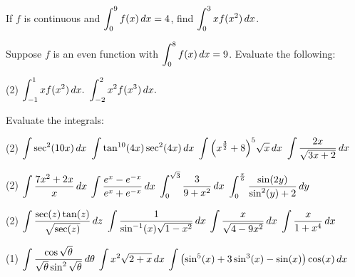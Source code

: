 \documentclass[answers]{exam}
\begin{document}
  \begin{ex*}
    If $f$ is continuous and $\ds\int_0^9 f(x)\,dx=4$, find $\ds\int_0^3 xf(x^2)\,dx$.
  \end{ex*}
  
  \begin{ex*}
    Suppose $f$ is an even function with $\ds\int_0^8 f(x)\,dx=9$. Evaluate the following:
  \end{ex*}
  \begin{tasks}(2)
    \task $\ds\int_{-1}^1 x f(x^2)\,dx.$
    \task $\ds\int_{-2}^2 x^2 f(x^3)\,dx.$
  \end{tasks}
  \pagebreak
  
  \begin{ex*}
    Evaluate the integrals:
  \end{ex*}
  \begin{tasks}[after-item-skip=\stretch{1}](2)
    \task $\ds\int \sec^2(10x)\,dx$
    \task $\ds\int \tan^{10}(4x)\sec^2(4x)\,dx$
    \task $\ds\int\parens{x^\frac{3}{2}+8}^5\sqrt{x}\,dx$
    \task $\ds\int \frac{2x}{\sqrt{3x+2}}\,dx$
  \end{tasks}
  \pagebreak
  
  \begin{tasks}[after-item-skip=\stretch{1}, resume](2)
    \task $\ds\int \frac{7x^2+2x}{x}\,dx$
    \task $\ds\int \frac{e^x-e\inv[x]}{e^x+e\inv[x]}\,dx$
    \task $\ds\int_0^{\sqrt{3}} \frac{3}{9+x^2}\,dx$
    \task $\ds\int_0^{\frac{\pi}{6}} \frac{\sin(2y)}{\sin^2(y)+2}\,dy$
  \end{tasks}
  \pagebreak
  
  \begin{tasks}[after-item-skip=\stretch{1}, resume](2)
    \task $\ds\int \frac{\sec(z)\tan(z)}{\sqrt{\sec(z)}}\,dz$
    \task $\ds\int \frac{1}{\sin\inv(x)\sqrt{1-x^2}}\,dx$
    \task $\ds\int \frac{x}{\sqrt{4-9x^2}}\,dx$
    \task $\ds\int \frac{x}{1+x^4}\,dx$
  \end{tasks}
  \pagebreak
  
  \begin{tasks}[after-item-skip=\stretch{1}, resume](1)
    \task $\ds\int \frac{\cos\sqrt{\theta}}{\sqrt{\theta}\sin^2\sqrt{\theta}}\,d\theta$
    \task $\ds\int x^2\sqrt{2+x}\,dx$
    \task* $\ds\int \parens{\sin^5(x)+3\sin^3(x)-\sin(x)}\cos(x)\,dx$
  \end{tasks}
  \pagebreak
  
\end{document}
